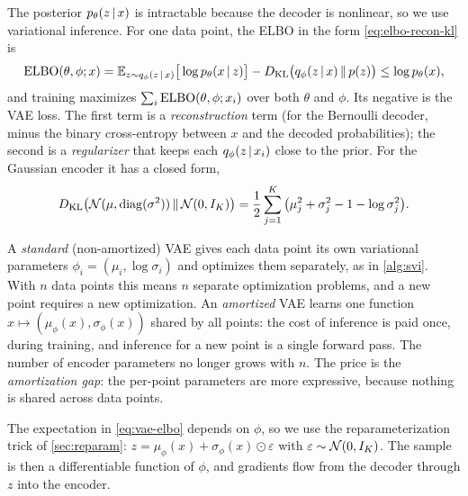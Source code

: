 The posterior $p_\theta(z\,|\, x)$ is intractable because the decoder is nonlinear, so we use variational inference. For one data point, the ELBO in the form \eqref{eq:elbo-recon-kl} is
\begin{equation}\label{eq:vae-elbo}
\operatorname{ELBO}(\theta,\phi;x)=\mathbb{E}_{z\sim q_\phi(z\,|\, x)}\big[\log p_\theta(x\,|\, z)\big]-D_{\mathrm{KL}}\big(q_\phi(z\,|\, x)\,\|\,p(z)\big)\le\log p_\theta(x),
\end{equation}
and training maximizes $\sum_i\operatorname{ELBO}(\theta,\phi;x_i)$ over both $\theta$ and $\phi$. Its negative is the VAE loss. The first term is a \emph{reconstruction} term (for the Bernoulli decoder, minus the binary cross-entropy between $x$ and the decoded probabilities); the second is a \emph{regularizer} that keeps each $q_\phi(z\,|\, x_i)$ close to the prior. For the Gaussian encoder it has a closed form,
\[
D_{\mathrm{KL}}\big(\mathcal{N}(\mu,\operatorname{diag}(\sigma^2))\,\|\,\mathcal{N}(0,I_K)\big)=\frac12\sum_{j=1}^K\big(\mu_j^2+\sigma_j^2-1-\log\sigma_j^2\big).
\]

\begin{remark}\label{rem:amortized}
A \emph{standard} (non-amortized) VAE gives each data point its own variational parameters $\phi_i=(\mu_i,\log\sigma_i)$ and optimizes them separately, as in \cref{alg:svi}. With $n$ data points this means $n$ separate optimization problems, and a new point requires a new optimization. An \emph{amortized} VAE learns one function $x\mapsto(\mu_\phi(x),\sigma_\phi(x))$ shared by all points: the cost of inference is paid once, during training, and inference for a new point is a single forward pass. The number of encoder parameters no longer grows with $n$. The price is the \emph{amortization gap}: the per-point parameters are more expressive, because nothing is shared across data points.
\end{remark}

The expectation in \eqref{eq:vae-elbo} depends on $\phi$, so we use the reparameterization trick of \cref{sec:reparam}: $z=\mu_\phi(x)+\sigma_\phi(x)\odot\varepsilon$ with $\varepsilon\sim\mathcal{N}(0,I_K)$. The sample is then a differentiable function of $\phi$, and gradients flow from the decoder through $z$ into the encoder.

